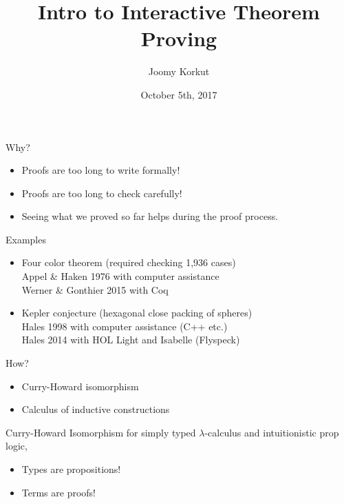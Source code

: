 \documentclass{beamer}
\title{Intro to Interactive Theorem Proving}
\author{Joomy Korkut}
\institute{Wesleyan University}
\date{October 5th, 2017}
\begin{document}
\begin{frame}
\titlepage
\end{frame}

\begin{frame}{Why?}
\begin{itemize}
\item<1-> Proofs are too long to write formally!
\item<2-> Proofs are too long to check carefully!
\item<3-> Seeing what we proved so far helps during the proof process.
\end{itemize}
\end{frame}

\begin{frame}{Examples}
\begin{itemize}
  \item<1-> Four color theorem (required checking 1,936 cases)
  \\ Appel \& Haken 1976 with computer assistance
  \\ Werner \& Gonthier 2015 with Coq
  \item<2-> Kepler conjecture (hexagonal close packing of spheres)
  \\ Hales 1998 with computer assistance (C++ etc.)
  \\ Hales 2014 with HOL Light and Isabelle (Flyspeck)
\end{itemize}
\end{frame}

\begin{frame}{How?}
\begin{itemize}
\item<1-> Curry-Howard isomorphism
\item<2-> Calculus of inductive constructions
\end{itemize}
\end{frame}

\begin{frame}{Curry-Howard Isomorphism}
  for simply typed $\lambda$-calculus and intuitionistic prop logic,
  \begin{itemize}
    \item Types are propositions!
    \pause
    \item Terms are proofs!
  \end{itemize}

  \pause
  \begin{columns}
    \begin{column}{0.5\textwidth}
      \begin{prooftree}
      \end{prooftree}
    \end{column}
    \begin{column}{0.5\textwidth}  %
      \begin{prooftree}
      \end{prooftree}
    \end{column}
  \end{columns}
\end{frame}
\end{document}
